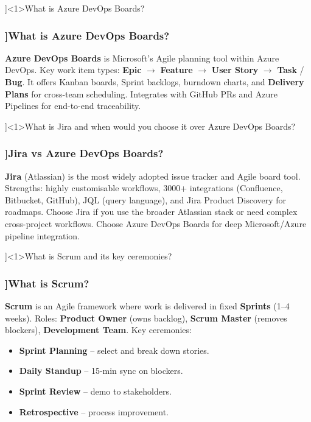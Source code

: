\QuestionSlide[\CategoryBadge[ToolingColor!20]{Tooling \& Agile}]<1>{What is Azure DevOps Boards?}

\begin{frame}[fragile]
  \frametitle{\AnswerTitle[\CategoryBadge[ToolingColor!20]{Tooling \& Agile}]{What is Azure DevOps Boards?}}

  {\footnotesize
  \textbf{Azure DevOps Boards} is Microsoft's Agile planning tool within Azure DevOps. Key work item types: \textbf{Epic} $\to$ \textbf{Feature} $\to$ \textbf{User Story} $\to$ \textbf{Task} / \textbf{Bug}. It offers Kanban boards, Sprint backlogs, burndown charts, and \textbf{Delivery Plans} for cross-team scheduling. Integrates with GitHub PRs and Azure Pipelines for end-to-end traceability.
  }
\end{frame}

\QuestionSlide[\CategoryBadge[ToolingColor!20]{Tooling \& Agile}]<1>{What is Jira and when would you choose it over Azure DevOps Boards?}

\begin{frame}[fragile]
  \frametitle{\AnswerTitle[\CategoryBadge[ToolingColor!20]{Tooling \& Agile}]{Jira vs Azure DevOps Boards?}}

  {\footnotesize
  \textbf{Jira} (Atlassian) is the most widely adopted issue tracker and Agile board tool. Strengths: highly customisable workflows, 3000+ integrations (Confluence, Bitbucket, GitHub), JQL (query language), and Jira Product Discovery for roadmaps. Choose Jira if you use the broader Atlassian stack or need complex cross-project workflows. Choose Azure DevOps Boards for deep Microsoft/Azure pipeline integration.
  }
\end{frame}

\QuestionSlide[\CategoryBadge[ToolingColor!20]{Tooling \& Agile}]<1>{What is Scrum and its key ceremonies?}

\begin{frame}[fragile]
  \frametitle{\AnswerTitle[\CategoryBadge[ToolingColor!20]{Tooling \& Agile}]{What is Scrum?}}

  {\footnotesize
  \textbf{Scrum} is an Agile framework where work is delivered in fixed \textbf{Sprints} (1–4 weeks). Roles: \textbf{Product Owner} (owns backlog), \textbf{Scrum Master} (removes blockers), \textbf{Development Team}. Key ceremonies:
  \begin{itemize}
    \item \textbf{Sprint Planning} – select and break down stories.
    \item \textbf{Daily Standup} – 15-min sync on blockers.
    \item \textbf{Sprint Review} – demo to stakeholders.
    \item \textbf{Retrospective} – process improvement.
  \end{itemize}
  }
\end{frame}

